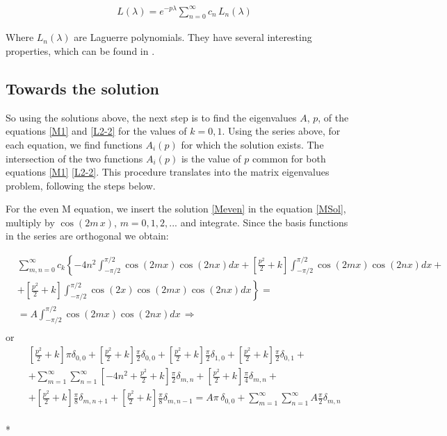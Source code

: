 \begin{equation}\label{Lsol1}
\begin{split}
& L(\lambda) =  e^{-p\lambda}\sum_{n=0}^{\infty}{c_n\,L_n(\lambda)}
\end{split}
\end{equation}

Where $ L_n(\lambda) $ are Laguerre polynomials. They have several interesting properties, which can be found in \cite{Laguerre1}.

\subsection{ Towards the solution }

So using the solutions above, the next step is to find the eigenvalues $ A $, $ p $, of the equations \eqref{M1} and \eqref{L2-2} for the values of $ k = 0,1 $. Using the series above, for each equation, we find functions $ A_i(p) $ for which the solution exists. The intersection of the two functions $ A_i(p) $ is the value of $ p $ common for both equations \eqref{M1} \eqref{L2-2}. This procedure translates into the matrix eigenvalues problem, following the steps below.

For the even M equation, we insert the solution \eqref{Meven} in the equation \eqref{MSol}, multiply by $ \cos(2m\,x) $, $ m = 0,1,2,... $ and integrate. Since the basis functions in the series are orthogonal we obtain:

\begin{equation}
\begin{split}
& \sum_{m,n=0}^{\infty}c_k \left\{-4n^2\int_{-\pi/2}^{\pi/2}{\cos(2 mx)\cos(2 nx)dx} + \left[ \frac{p^2}{2} +k \right]\int_{-\pi/2}^{\pi/2}{\cos(2 mx)\cos(2 nx)dx} + \right. \\[.8em]
& \left. + \left[ \frac{p^2}{2} + k\right] \int_{-\pi/2}^{\pi/2}{\cos(2 x)\cos(2 mx)\cos(2 nx)dx} \right\} = \\[.8em]
& = A \int_{-\pi/2}^{\pi/2}{\cos(2 mx)\cos(2 nx)dx}  \,\Longrightarrow\\[.8em]
\end{split}
\end{equation}
or
\begin{equation}
\begin{split}
& \left[ \frac{p^2}{2} +k\right]\pi\delta_{0,0} + \left[ \frac{p^2}{2} +k\right]\frac{\pi}{2}\delta_{0,0}+ \left[ \frac{p^2}{2} +k\right]\frac{\pi}{2}\delta_{1,0}+ \left[ \frac{p^2}{2} +k\right]\frac{\pi}{2}\delta_{0,1} + \\[.8em] 
& + \sum_{m=1}^{\infty}\sum_{n=1}^{\infty} {\left[-4n^2 +\frac{p^2}{2} + k\right]\frac{\pi}{2} \delta_{m,n} + \left[\frac{p^2}{2} + k\right]\frac{\pi}{4} \delta_{m,n} } + \\[.8em]
& + \left[\frac{p^2}{2}+k\right]\frac{\pi}{8}\delta_{m,n+1} + \left[\frac{p^2}{2}+k\right]\frac{\pi}{8}\delta_{m,n-1}  = A \pi\,\delta_{0,0} + \sum_{m=1}^{\infty}\sum_{n=1}^{\infty}{A\frac{\pi}{2}\delta_{m,n}}
\end{split}
\end{equation}\\*

